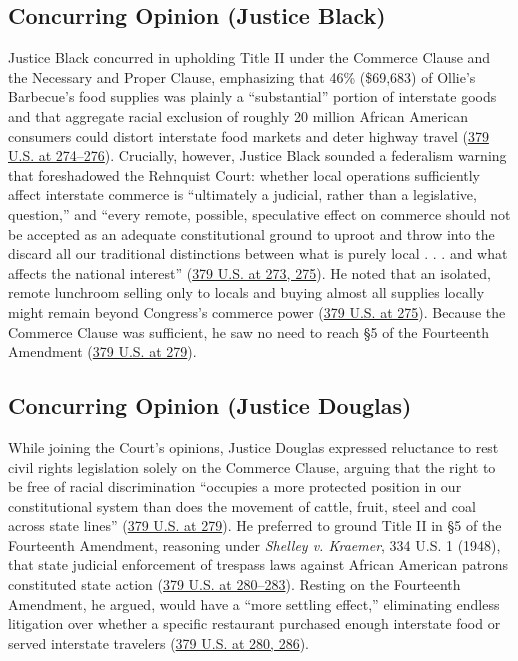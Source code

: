\documentclass[12pt]{article}
\begin{document}
\subsection{Concurring Opinion (Justice Black)}

Justice Black concurred in upholding Title II under the Commerce Clause and the Necessary and Proper Clause, emphasizing that 46\% (\$69,683) of Ollie's Barbecue's food supplies was plainly a ``substantial'' portion of interstate goods and that aggregate racial exclusion of roughly 20 million African American consumers could distort interstate food markets and deter highway travel (\href{https://supreme.justia.com/cases/federal/us/379/241/}{379 U.S. at 274--276}). Crucially, however, Justice Black sounded a federalism warning that foreshadowed the Rehnquist Court: whether local operations sufficiently affect interstate commerce is ``ultimately a judicial, rather than a legislative, question,'' and ``every remote, possible, speculative effect on commerce should not be accepted as an adequate constitutional ground to uproot and throw into the discard all our traditional distinctions between what is purely local . . . and what affects the national interest'' (\href{https://supreme.justia.com/cases/federal/us/379/241/}{379 U.S. at 273, 275}). He noted that an isolated, remote lunchroom selling only to locals and buying almost all supplies locally might remain beyond Congress's commerce power (\href{https://supreme.justia.com/cases/federal/us/379/241/}{379 U.S. at 275}). Because the Commerce Clause was sufficient, he saw no need to reach \S 5 of the Fourteenth Amendment (\href{https://supreme.justia.com/cases/federal/us/379/241/}{379 U.S. at 279}).

\subsection{Concurring Opinion (Justice Douglas)}

While joining the Court's opinions, Justice Douglas expressed reluctance to rest civil rights legislation solely on the Commerce Clause, arguing that the right to be free of racial discrimination ``occupies a more protected position in our constitutional system than does the movement of cattle, fruit, steel and coal across state lines'' (\href{https://supreme.justia.com/cases/federal/us/379/241/}{379 U.S. at 279}). He preferred to ground Title II in \S 5 of the Fourteenth Amendment, reasoning under \textit{Shelley v. Kraemer}, 334 U.S. 1 (1948), that state judicial enforcement of trespass laws against African American patrons constituted state action (\href{https://supreme.justia.com/cases/federal/us/379/241/}{379 U.S. at 280--283}). Resting on the Fourteenth Amendment, he argued, would have a ``more settling effect,'' eliminating endless litigation over whether a specific restaurant purchased enough interstate food or served interstate travelers (\href{https://supreme.justia.com/cases/federal/us/379/241/}{379 U.S. at 280, 286}).
\end{document}
